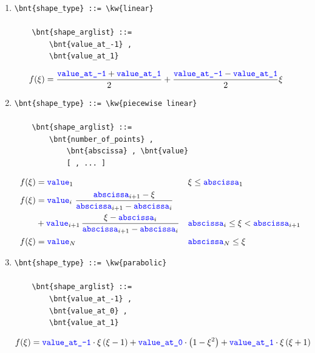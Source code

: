 \begin{enumerate}
    \item {}
\begin{Verbatim}[commandchars=\\\{\}]
    \bnt{shape_type} ::= \kw{linear}

    \bnt{shape_arglist} ::=
        \bnt{value_at_-1} , 
        \bnt{value_at_1}
\end{Verbatim}
\begin{align}
	f(\xi) &= \frac{\textcolor{blue}{\texttt{value\_at\_-1}} + \textcolor{blue}{\texttt{value\_at\_1}}}{2}
		+ \frac{\textcolor{blue}{\texttt{value\_at\_-1}} - \textcolor{blue}{\texttt{value\_at\_1}}}{2} \xi
\end{align}

    \item {}
\begin{Verbatim}[commandchars=\\\{\}]
    \bnt{shape_type} ::= \kw{piecewise linear}

    \bnt{shape_arglist} ::=
        \bnt{number_of_points} , 
            \bnt{abscissa} , \bnt{value}
            [ , ... ]
\end{Verbatim}
\begin{subequations}
\begin{align}
	f(\xi) &= \textcolor{blue}{\texttt{value}}_1	&& \xi \le \textcolor{blue}{\texttt{abscissa}}_1
	\\
	f(\xi) &=
		\textcolor{blue}{\texttt{value}}_i \, \, \frac{\textcolor{blue}{\texttt{abscissa}}_{i+1} - \xi}{\textcolor{blue}{\texttt{abscissa}}_{i+1} - \textcolor{blue}{\texttt{abscissa}}_i}
	\nonumber \\
		&
		+ \textcolor{blue}{\texttt{value}}_{i+1} \, \frac{\xi - \textcolor{blue}{\texttt{abscissa}}_i}{\textcolor{blue}{\texttt{abscissa}}_{i+1} - \textcolor{blue}{\texttt{abscissa}}_i}
		&& \textcolor{blue}{\texttt{abscissa}}_i \le \xi < \textcolor{blue}{\texttt{abscissa}}_{i+1}
	\\
	f(\xi) &= \textcolor{blue}{\texttt{value}}_N	&& \textcolor{blue}{\texttt{abscissa}}_N \le \xi
\end{align}
\end{subequations}

    \item {}
\begin{Verbatim}[commandchars=\\\{\}]
    \bnt{shape_type} ::= \kw{parabolic}

    \bnt{shape_arglist} ::=
        \bnt{value_at_-1} , 
        \bnt{value_at_0} , 
        \bnt{value_at_1}
\end{Verbatim}
\begin{align}
	f(\xi) &= \textcolor{blue}{\texttt{value\_at\_-1}} \cdot \xi\left( \xi - 1 \right)
		+ \textcolor{blue}{\texttt{value\_at\_0}} \cdot \left( 1 - \xi^2 \right)
		+ \textcolor{blue}{\texttt{value\_at\_1}} \cdot \xi\left( \xi + 1 \right)
\end{align}

\end{enumerate}
